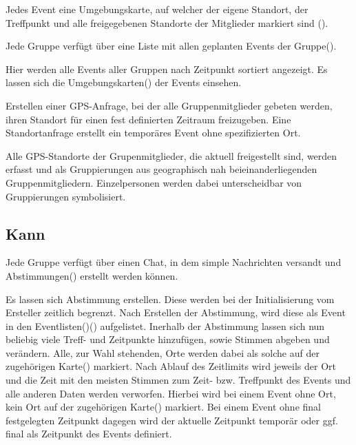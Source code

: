 \documentclass[parskip=full,11pt]{scrartcl}
\begin{document}
Jedes Event eine Umgebungskarte, auf welcher der eigene Standort,
der Treffpunkt und alle freigegebenen Standorte der Mitglieder markiert sind ().

Jede Gruppe verfügt über eine Liste mit allen geplanten Events der Gruppe().

Hier werden alle Events aller Gruppen nach Zeitpunkt sortiert angezeigt.
Es lassen sich die Umgebungskarten() der Events einsehen.


Erstellen einer GPS-Anfrage, bei der alle Gruppenmitglieder gebeten werden,
ihren Standort für einen fest definierten Zeitraum freizugeben.
Eine Standortanfrage erstellt ein temporäres Event ohne spezifizierten Ort.

Alle GPS-Standorte der Grupenmitglieder, die aktuell freigestellt sind,
werden erfasst und als Gruppierungen aus geographisch nah beieinanderliegenden Gruppenmitgliedern.
Einzelpersonen werden dabei unterscheidbar von Gruppierungen symbolisiert.

\subsection{Kann}

Jede Gruppe verfügt über einen Chat, in dem simple Nachrichten versandt und
Abstimmungen() erstellt werden können.

Es lassen sich Abstimmung erstellen.
Diese werden bei der Initialisierung vom Ersteller zeitlich begrenzt.
Nach Erstellen der Abstimmung, wird diese als Event in den
Eventlisten()() aufgelistet.
Inerhalb der Abstimmung lassen sich nun beliebig viele Treff- und Zeitpunkte hinzufügen, sowie Stimmen abgeben und verändern.
Alle, zur Wahl stehenden, Orte werden dabei als solche auf der zugehörigen Karte() markiert.
Nach Ablauf des Zeitlimits wird jeweils der Ort und die Zeit mit den meisten Stimmen
zum Zeit- bzw. Treffpunkt des Events und alle anderen Daten werden verworfen.
Hierbei wird bei einem Event ohne Ort, kein Ort auf der zugehörigen Karte() markiert.
Bei einem Event ohne final festgelegten Zeitpunkt dagegen wird der aktuelle Zeitpunkt
temporär oder ggf. final als Zeitpunkt des Events definiert.
\end{document}
